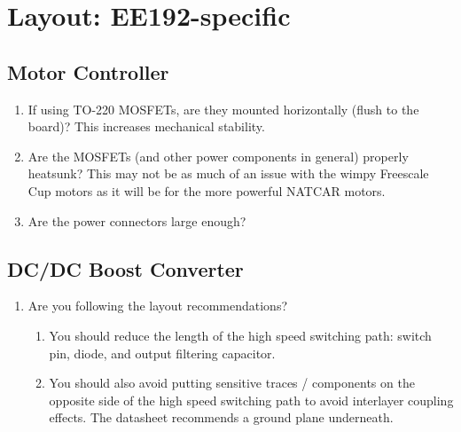 \documentclass{article}
\begin{document}
\section{Layout: EE192-specific}
\subsection{Motor Controller}
\begin{enumerate}
  \item If using TO-220 MOSFETs, are they mounted horizontally (flush to the board)? This increases mechanical stability.
  \item Are the MOSFETs (and other power components in general) properly heatsunk? This may not be as much of an issue with the wimpy Freescale Cup motors as it will be for the more powerful NATCAR motors.
  \item Are the power connectors large enough?
\end{enumerate}

\subsection{DC/DC Boost Converter}
\begin{enumerate}
  \item Are you following the layout recommendations?
  \begin{enumerate}
     \item You should reduce the length of the high speed switching path: switch pin, diode, and output filtering capacitor.
     \item You should also avoid putting sensitive traces / components on the opposite side of the high speed switching path to avoid interlayer coupling effects. The datasheet recommends a ground plane underneath.
  \end{enumerate}
\end{enumerate}
\end{document}
